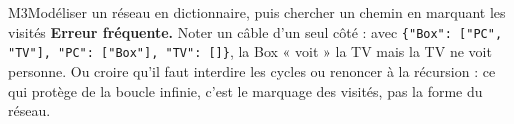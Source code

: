 \begin{fichemethode}{M3}{Modéliser un réseau en dictionnaire, puis chercher un chemin en marquant les visités}
\textbf{Erreur fréquente.} Noter un câble d'un seul côté : avec
\lstinline|{"Box": ["PC", "TV"], "PC": ["Box"], "TV": []}|, la Box « voit » la TV mais la TV
ne voit personne. Ou croire qu'il faut interdire les cycles ou renoncer à la récursion : ce
qui protège de la boucle infinie, c'est le marquage des visités, pas la forme du réseau.

\end{fichemethode}

